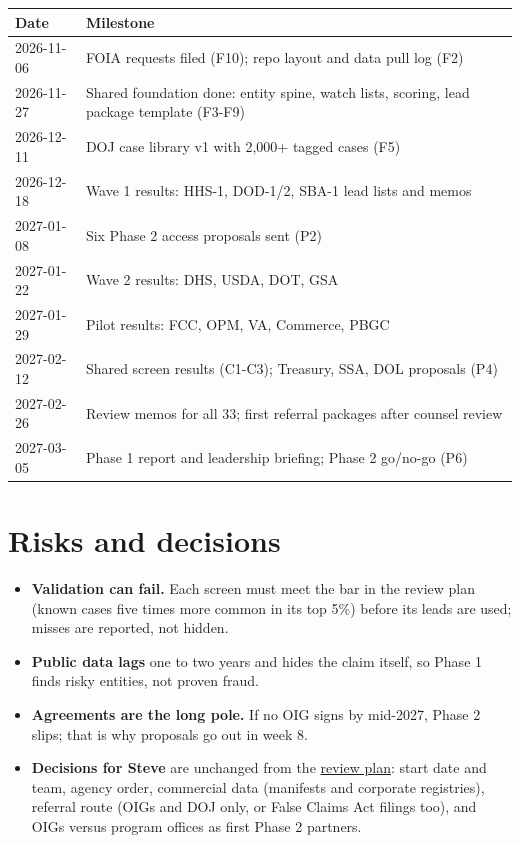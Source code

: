 \documentclass[letterpaper,11pt]{article}
\providecommand{\tightlist}{\setlength{\itemsep}{0pt}\setlength{\parskip}{0pt}}
\begin{document}
\begingroup\small\setlength{\tabcolsep}{4pt}\renewcommand{\arraystretch}{1.25}
\begin{longtable}[l]{@{}l>{\raggedright\arraybackslash}p{}@{}}
\rowcolor{coolblack}\leavevmode\color{white}\bfseries Date & \leavevmode\color{white}\bfseries Milestone \\
\endhead
2026-11-06 & FOIA requests filed (F10); repo layout and data pull log (F2) \\
2026-11-27 & Shared foundation done: entity spine, watch lists, scoring, lead package template (F3-F9) \\
2026-12-11 & DOJ case library v1 with 2,000+ tagged cases (F5) \\
2026-12-18 & Wave 1 results: HHS-1, DOD-1/2, SBA-1 lead lists and memos \\
2027-01-08 & Six Phase 2 access proposals sent (P2) \\
2027-01-22 & Wave 2 results: DHS, USDA, DOT, GSA \\
2027-01-29 & Pilot results: FCC, OPM, VA, Commerce, PBGC \\
2027-02-12 & Shared screen results (C1-C3); Treasury, SSA, DOL proposals (P4) \\
2027-02-26 & Review memos for all 33; first referral packages after counsel review \\
2027-03-05 & Phase 1 report and leadership briefing; Phase 2 go/no-go (P6) \\
\end{longtable}\endgroup

\hypertarget{risks-and-decisions}{%
\section{Risks and decisions}\label{risks-and-decisions}}

\begin{itemize}
\tightlist
\item
  \textbf{Validation can fail.} Each screen must meet the bar in the
  review plan (known cases five times more common in its top 5\%) before
  its leads are used; misses are reported, not hidden.
\item
  \textbf{Public data lags} one to two years and hides the claim itself,
  so Phase 1 finds risky entities, not proven fraud.
\item
  \textbf{Agreements are the long pole.} If no OIG signs by mid-2027,
  Phase 2 slips; that is why proposals go out in week 8.
\item
  \textbf{Decisions for Steve} are unchanged from the
  \href{review_plan.pdf}{review plan}: start date and team, agency
  order, commercial data (manifests and corporate registries), referral
  route (OIGs and DOJ only, or False Claims Act filings too), and OIGs
  versus program offices as first Phase 2 partners.
\end{itemize}
\end{document}
